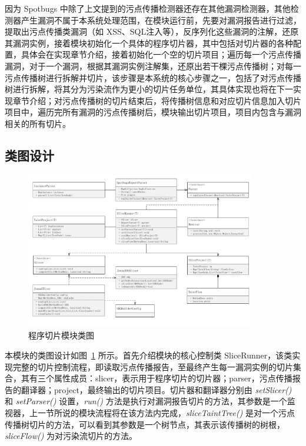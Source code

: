 因为 Spotbugs 中除了上文提到的污点传播检测器还存在其他漏洞检测器，其他检测器产生漏洞不属于本系统处理范围，在模块运行前，先要对漏洞报告进行过滤，提取出污点传播类漏洞（如 XSS、SQL注入等），反序列化这些漏洞的注解，还原其漏洞实例，接着模块初始化一个具体的程序切片器，其中包括对切片器的各种配置，具体会在实现章节介绍，接着初始化一个空的切片项目；遍历每一个污点传播漏洞，对于一个漏洞，根据其漏洞实例注解集，还原出若干棵污点传播树；对每一污点传播树进行拆解并切片，该步骤是本系统的核心步骤之一，包括了对污点传播树进行拆解，将其分为污染流作为更小的切片任务单位，其具体实现也将在下一实现章节介绍；对污点传播树的切片结束后，将传播树信息和对应切片信息加入切片项目中，遍历完所有漏洞的污点传播树后，模块输出切片项目，项目内包含与漏洞相关的所有切片。

\subsection{类图设计}

\begin{figure}[!htb]
    \centering
    \includegraphics[width=0.9\textwidth]{FIGs/chapter3/sliceClass.pdf}
    \caption{程序切片模块类图}\label{sliceClass}
\end{figure}

本模块的类图设计如图~\ref{sliceClass} 所示。首先介绍模块的核心控制类 SliceRunner，该类实现完整的切片控制流程，即读取污点传播报告，至最终产生每一漏洞实例的切片集合，其有三个属性成员：slicer，表示用于程序切片的切片器；parser，污点传播报告的翻译器；project，最终输出的切片项目。切片器和翻译器分别由 \textit{setSlicer()} 和 \textit{setParser()} 设置，\textit{run()} 方法是执行对漏洞报告切片的方法，其参数是一个监视器，上一节所说的模块流程将在该方法内完成，\textit{sliceTaintTree()} 是对一个污点传播树切片的方法，可以看到其参数是一个树节点，其表示该传播树的树根，\textit{sliceFlow()} 为对污染流切片的方法。

